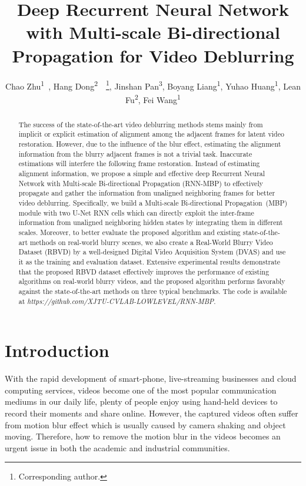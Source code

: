 \documentclass[letterpaper]{article} \usepackage{aaai22}  \usepackage{times}  \usepackage{helvet}  \usepackage{courier}  \usepackage[hyphens]{url}  \usepackage{graphicx} \urlstyle{rm} \def\UrlFont{\rm}  \usepackage{natbib}  \usepackage{caption} \DeclareCaptionStyle{ruled}{labelfont=normalfont,labelsep=colon,strut=off} \frenchspacing  \setlength{\pdfpagewidth}{8.5in}  \setlength{\pdfpageheight}{11in}  \newcommand{\hang}{\textcolor[rgb]{0.98,0.5,0.04}}
\title{Deep Recurrent Neural Network with Multi-scale Bi-directional Propagation for Video Deblurring\\}
\author{
Chao Zhu\textsuperscript{\rm 1}~\equalcontrib,
    Hang Dong\textsuperscript{\rm 2}~\equalcontrib~\thanks{Corresponding author.},
    Jinshan Pan\textsuperscript{\rm 3},
    Boyang Liang\textsuperscript{\rm 1},
    Yuhao Huang\textsuperscript{\rm 1},
    Lean Fu\textsuperscript{\rm 2},
    Fei Wang\textsuperscript{\rm 1}
}
\begin{document}
\maketitle

\begin{abstract}



The success of the state-of-the-art video deblurring methods stems mainly from implicit or explicit estimation of alignment among the adjacent frames for latent video restoration. 
However, due to the influence of the blur effect, estimating the alignment information from the blurry adjacent frames is not a trivial task.
Inaccurate estimations will interfere the following frame restoration. 
Instead of estimating alignment information, we propose a simple and effective deep Recurrent Neural Network with Multi-scale Bi-directional Propagation (RNN-MBP) to effectively propagate and gather the information from unaligned neighboring frames for better video deblurring. 
Specifically, we build a Multi-scale Bi-directional Propagation~(MBP) module with two U-Net RNN cells which can directly exploit the inter-frame information from unaligned neighboring hidden states by integrating them in different scales.
Moreover, to better evaluate the proposed algorithm and existing state-of-the-art methods on real-world blurry scenes, we also create a Real-World Blurry Video Dataset (RBVD) by a well-designed Digital Video Acquisition System (DVAS) and use it as the training and evaluation dataset. 
Extensive experimental results demonstrate that the proposed RBVD dataset effectively improves the performance of existing algorithms on real-world blurry videos, and the proposed algorithm performs favorably against the state-of-the-art methods on three typical benchmarks.
The code is available at \emph{https://github.com/XJTU-CVLAB-LOWLEVEL/RNN-MBP}.

\end{abstract}


\section{Introduction}
With the rapid development of smart-phone, live-streaming businesses and cloud computing services, videos become one of the most popular communication mediums in our daily life, 
plenty of people enjoy using hand-held devices to record their moments and share online. However, the captured videos often suffer from motion blur effect which is usually caused by camera shaking and object moving.
Therefore, how to remove the motion blur in the videos becomes an urgent issue in both the academic and industrial communities.
\end{document}
